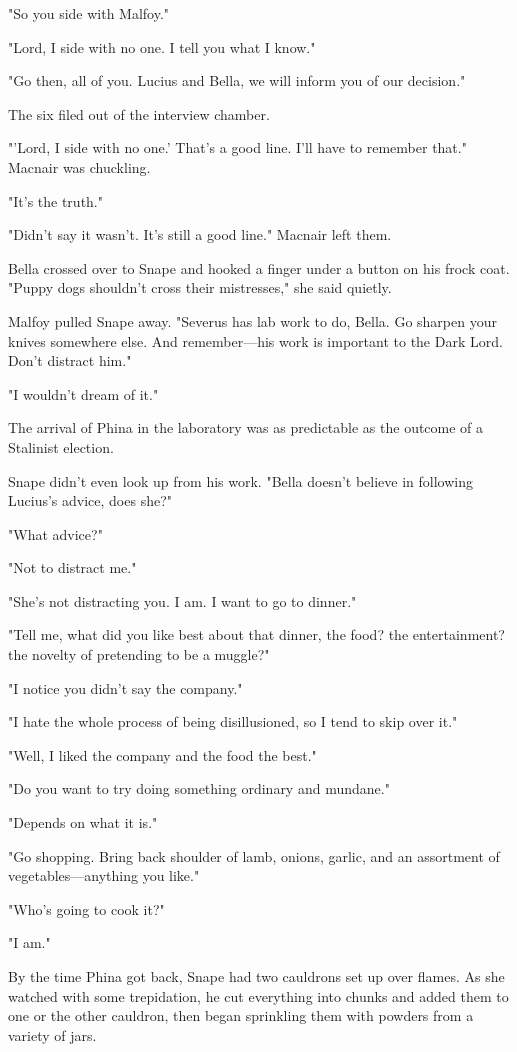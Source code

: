 "So you side with Malfoy."

"Lord, I side with no one. I tell you what I know."

"Go then, all of you. Lucius and Bella, we will inform you of our decision."

The six filed out of the interview chamber.

"'Lord, I side with no one.' That's a good line. I'll have to remember that." Macnair was chuckling.

"It's the truth."

"Didn't say it wasn't. It's still a good line." Macnair left them.

Bella crossed over to Snape and hooked a finger under a button on his frock coat. "Puppy dogs shouldn't cross their mistresses," she said quietly.

Malfoy pulled Snape away. "Severus has lab work to do, Bella. Go sharpen your knives somewhere else. And remember—his work is important to the Dark Lord. Don't distract him."

"I wouldn't dream of it."

The arrival of Phina in the laboratory was as predictable as the outcome of a Stalinist election.

Snape didn't even look up from his work. "Bella doesn't believe in following Lucius's advice, does she?"

"What advice?"

"Not to distract me."

"She's not distracting you. I am. I want to go to dinner."

"Tell me, what did you like best about that dinner, the food? the entertainment? the novelty of pretending to be a muggle?"

"I notice you didn't say the company."

"I hate the whole process of being disillusioned, so I tend to skip over it."

"Well, I liked the company and the food the best."

"Do you want to try doing something ordinary and mundane."

"Depends on what it is."

"Go shopping. Bring back shoulder of lamb, onions, garlic, and an assortment of vegetables—anything you like."

"Who's going to cook it?"

"I am."

By the time Phina got back, Snape had two cauldrons set up over flames. As she watched with some trepidation, he cut everything into chunks and added them to one or the other cauldron, then began sprinkling them with powders from a variety of jars.

